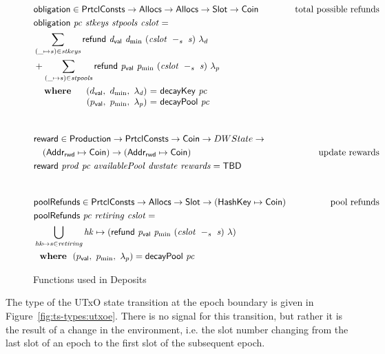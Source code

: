 \begin{figure}[htb]
  \begin{align*}
      & \fun{obligation} \in \PrtclConsts \to \Allocs \to \Allocs \to \Slot \to \Coin
      & \text{total possible refunds} \\
      & \obligation{pc}{stkeys}{stpools}{cslot} =\\
      & \sum\limits_{(\_ \mapsto s) \in \var{stkeys}}
        \refund{d_{\mathsf{val}}}{d_{\min}}{(\slotminus{cslot}{s})}{\lambda_d} \\
      & + \sum\limits_{(\_ \mapsto s) \in \var{stpools}}
        \refund{p_{\mathsf{val}}}{p_{\min}}{(\slotminus{cslot}{s})}{\lambda_p} \\
      &
      \begin{array}{lr@{~=~}l}
        \where
          & (\dval,~d_{\min},~\lambda_d) & \fun{decayKey}~\var{pc}\\
          & (p_{\mathsf{val}},~p_{\min},~\lambda_p) & \fun{decayPool}~\var{pc}\\
      \end{array}\\
      \nextdef
      & \fun{reward} \in \Production \to \PrtclConsts \to \Coin \to DWState \to \\
      & ~~~ (\AddrRWD \mapsto \Coin) \to (\AddrRWD \mapsto \Coin)
      & \text{update rewards} \\
      & \reward{prod}{pc}{availablePool}{dwstate}{rewards} = \mathsf{TBD}\\
      \nextdef
      & \fun{poolRefunds} \in \PrtclConsts \to \Allocs \to \Slot \to (\HashKey \mapsto \Coin)
      & \text{pool refunds} \\
      & \poolRefunds{pc}{retiring}{cslot} = \\
      & \bigcup_{\var{hk}\mapsto s\in\var{retiring}}
          \var{hk}\mapsto( \refund{p_{\mathsf{val}}}{p_{\min}}{(\slotminus{cslot}{s})}{\lambda} ) \\
      &
        \where (p_{\mathsf{val}},~p_{\min},~\lambda_p) = \fun{decayPool}~\var{pc}\\
  \end{align*}
  \caption{Functions used in Deposits}
  \label{fig:functions:epoch}
\end{figure}


The type of the UTxO state transition at the epoch boundary is given in
Figure~\ref{fig:ts-types:utxoe}. There is no signal for this transition, but rather
it is the result of a change in the environment, i.e. the slot number changing
from the last slot of an epoch to the first slot of the subsequent epoch.

